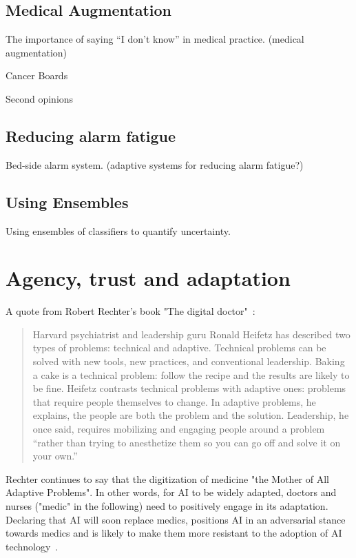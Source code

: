 \documentclass[10pt]{wlscirep}
\begin{document}
\subsection*{Medical Augmentation}
The importance of saying “I don’t know” in medical practice. (medical augmentation)

Cancer Boards

Second opinions

\subsection*{Reducing alarm fatigue}
Bed-side alarm system. (adaptive systems for reducing alarm fatigue?)

\subsection*{Using Ensembles}

Using ensembles of classifiers to quantify uncertainty.

\section{Agency, trust and adaptation}

A quote from Robert Rechter's book "The digital doctor"~\cite{wachter2015digital}:
\begin{quote}
    Harvard psychiatrist and leadership guru Ronald Heifetz has described two types of problems: technical and adaptive. Technical problems can be solved with new tools, new practices, and conventional leadership. Baking a cake is a technical problem: follow the recipe and the results are likely to be fine. Heifetz contrasts technical problems with adaptive ones: problems that require people themselves to change. In adaptive problems, he explains, the people
    are both the problem and the solution. Leadership, he once said, requires mobilizing and engaging people around a problem “rather than trying to anesthetize them so you can go off and solve it on your own.” 
\end{quote}

Rechter continues to say that the digitization of medicine "the Mother of All Adaptive Problems". In other words, for AI to be widely adapted, doctors and nurses ("medic" in the following) need to positively engage in its adaptation. Declaring that AI will soon replace medics, positions AI in an adversarial stance towards medics and is likely to make them more resistant to the adoption of AI technology~\cite{topol2019deep}.
\end{document}
